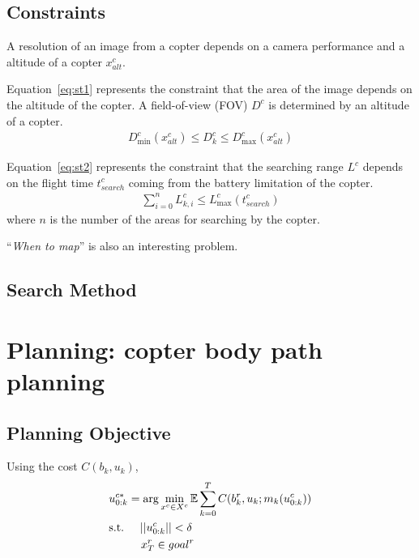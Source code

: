 \documentclass[conference]{IEEEtran}
\begin{document}
\subsection{Constraints}

A resolution of an image from a copter depends on a camera performance and a altitude of a copter $x^c_{alt}$.

Equation~\eqref{eq:st1} represents the constraint that the area of the image depends on the altitude of the copter.
A field-of-view (FOV) $D^c$ is determined by an altitude of a copter.
\begin{align}
    D^c_{\min}(x^c_{alt}) \leq D^c_k \leq D^c_{\max}(x^c_{alt})
\end{align}

Equation~\eqref{eq:st2} represents the constraint that the searching range $L^c$ depends on the flight time $t^c_{search}$ coming from the battery limitation of the copter.
\begin{align}
    \sum^{n}_{i=0} L^c_{k,i} \leq L^c_{\max}(t^c_{search})
\end{align}
where $n$ is the number of the areas for searching by the copter.

``{\it When to map}'' is also an interesting problem.

\subsection{Search Method}


\section{Planning: copter body path planning}
\subsection{Planning Objective}
Using the cost $C(b_k, u_k)$,
\begin{align}
    &u^{c*}_{0:k}=\arg\min_{x^c \in X^c} \mathbb{E} \sum^T_{k=0} C(b^r_k, u_k; m_k (u^c_{0:k}))\\
    &{\rm s.t.} \hspace{5mm} ||u^c_{0:k}||< \delta\label{eq:st10}\\
    &\hspace{10mm} x^r_T \in goal^r\label{eq:st20}
\end{align}
\end{document}
